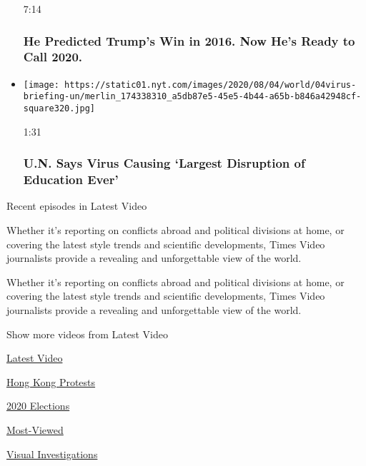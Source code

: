 \begin{itemize}
  7:14

  \hypertarget{he-predicted-trumps-win-in-2016-now-hes-ready-to-call-2020}{%
  \subsubsection{He Predicted Trump's Win in 2016. Now He's Ready to
  Call
  2020.}\label{he-predicted-trumps-win-in-2016-now-hes-ready-to-call-2020}}
\item
  \href{https://www.nytimes.com/video/us/100000007272762/un-secretary-generational-catastrophe-schools-reopen.html?action=click\&module=video-series-bar\&region=header\&pgtype=Article\&playlistId=video/latest-video}{}

  \texttt{[image: https://static01.nyt.com/images/2020/08/04/world/04virus-briefing-un/merlin\_174338310\_a5db87e5-45e5-4b44-a65b-b846a42948cf-square320.jpg]}

  1:31

  \hypertarget{un-says-virus-causing-largest-disruption-of-education-ever}{%
  \subsubsection{U.N. Says Virus Causing `Largest Disruption of
  Education
  Ever'}\label{un-says-virus-causing-largest-disruption-of-education-ever}}
\end{itemize}

Recent episodes in Latest Video

Whether it's reporting on conflicts abroad and political divisions at
home, or covering the latest style trends and scientific developments,
Times Video journalists provide a revealing and unforgettable view of
the world.

Whether it's reporting on conflicts abroad and political divisions at
home, or covering the latest style trends and scientific developments,
Times Video journalists provide a revealing and unforgettable view of
the world.

Show more videos from Latest Video

\href{/video}{}

\href{/video/latest-video}{Latest Video}

\href{/video/hk-protest}{Hong Kong Protests}

\href{/video/2020-Elections}{2020 Elections}

\href{/video/Most-Viewed}{Most-Viewed}

\href{/video/investigations}{Visual Investigations}


